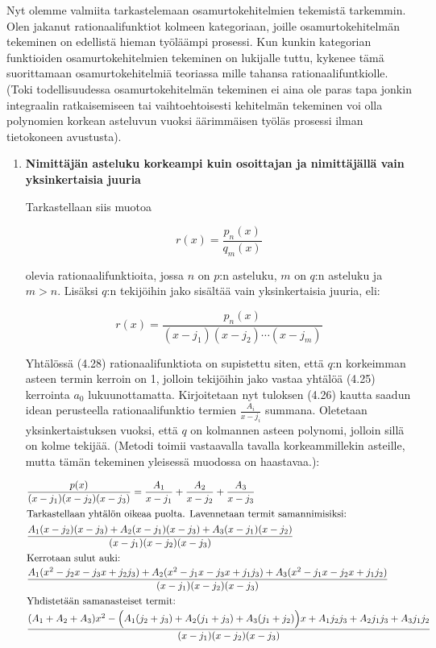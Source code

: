 \documentclass[../integrointiopas.tex]{subfiles}
\begin{document}
	Nyt olemme valmiita tarkastelemaan osamurtokehitelmien tekemistä tarkemmin. Olen jakanut rationaalifunktiot kolmeen kategoriaan, joille osamurtokehitelmän tekeminen on edellistä hieman työläämpi prosessi. Kun kunkin kategorian funktioiden osamurtokehitelmien tekeminen on lukijalle tuttu, kykenee tämä suorittamaan osamurtokehitelmiä teoriassa mille tahansa rationaalifuntkiolle. (Toki todellisuudessa osamurtokehitelmän tekeminen ei aina ole paras tapa jonkin integraalin ratkaisemiseen tai vaihtoehtoisesti kehitelmän tekeminen voi olla polynomien korkean asteluvun vuoksi äärimmäisen työläs prosessi ilman tietokoneen avustusta). \\
	
	\begin{enumerate}
		\item \textbf{Nimittäjän asteluku korkeampi kuin osoittajan ja nimittäjällä vain yksinkertaisia juuria}
		
		Tarkastellaan siis muotoa
		
		\begin{equation}
			r(x) = \frac{p_n(x)}{q_m(x)}
		\end{equation}
	
		olevia rationaalifunktioita, jossa $n$ on $p$:n asteluku, $m$ on $q$:n asteluku ja $m > n$. Lisäksi $q$:n tekijöihin jako sisältää vain yksinkertaisia juuria, eli:
		
		\begin{equation}
			r(x) = \frac{p_n(x)}{(x - j_1)(x - j_2)\cdots(x - j_m)}
		\end{equation}
	
		Yhtälössä (4.28) rationaalifunktiota on supistettu siten, että $q$:n korkeimman asteen termin kerroin on 1, jolloin tekijöihin jako vastaa yhtälöä (4.25) kerrointa $a_0$ lukuunottamatta. Kirjoitetaan nyt tuloksen (4.26) kautta saadun idean perusteella rationaalifunktio termien $\frac{A_i}{x - j_i}$ summana. Oletetaan yksinkertaistuksen vuoksi, että $q$ on kolmannen asteen polynomi, jolloin sillä on kolme tekijää. (Metodi toimii vastaavalla tavalla korkeammillekin asteille, mutta tämän tekeminen yleisessä muodossa on haastavaa.):
		
		\begin{align}
			&\frac{p(x)}{(x - j_1)(x - j_2)(x - j_3)} = \frac{A_1}{x - j_1} + \frac{A_2}{x - j_2} + \frac{A_3}{x - j_3} \\
			\intertext{Tarkastellaan yhtälön oikeaa puolta. Lavennetaan termit samannimisiksi:}
			&\frac{A_1(x - j_2)(x - j_3) + A_2(x - j_1)(x - j_3) + A_3(x - j_1)(x - j_2)}{(x - j_1)(x - j_2)(x - j_3)} \\
			\intertext{Kerrotaan sulut auki:}
			&\frac{A_1(x^2 - j_2x - j_3x + j_2j_3) + A_2(x^2 - j_1x - j_3x + j_1j_3) + A_3(x^2 - j_1x - j_2x + j_1j_2)}{(x - j_1)(x - j_2)(x - j_3)} \\
			\intertext{Yhdistetään samanasteiset termit:}
			&\frac{(A_1 + A_2 + A_3)x^2 - \Big(A_1(j_2 + j_3) + A_2(j_1 + j_3) + A_3(j_1 + j_2)\Big)x  + A_1j_2j_3 + A_2j_1j_3 + A_3j_1j_2}{(x - j_1)(x - j_2)(x - j_3)}
		\end{align}
	

\end{enumerate}
\end{document}
